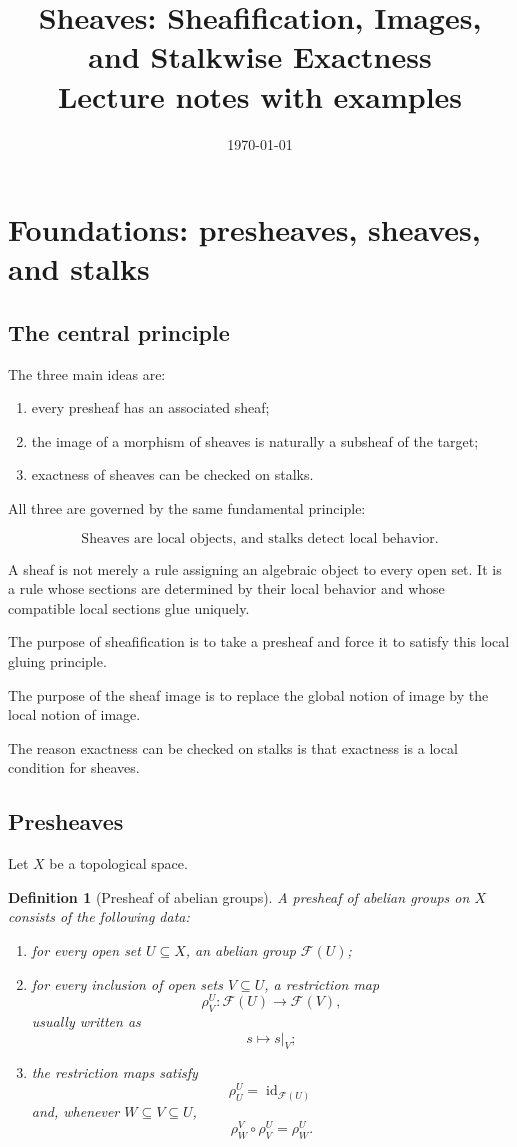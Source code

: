 \documentclass[12pt,a4paper]{article}
\title{\bfseries Sheaves: Sheafification, Images, and Stalkwise Exactness\\


\large Lecture notes with examples}
\author{}
\date{\today}
\DeclareMathOperator{\id}{id}
\theoremstyle{notespace}
\newtheorem{definition}{Definition}[subsection]
\begin{document}
\maketitle
\tableofcontents
\clearpage

\section{Foundations: presheaves, sheaves, and stalks}

\subsection{The central principle}
The three main ideas are:

\begin{enumerate}
	\item every presheaf has an associated sheaf;
	\item the image of a morphism of sheaves is naturally a subsheaf of the target;
	\item exactness of sheaves can be checked on stalks.
\end{enumerate}

All three are governed by the same fundamental principle:

\[
\boxed{
	\text{Sheaves are local objects, and stalks detect local behavior.}
}
\]

A sheaf is not merely a rule assigning an algebraic object to every open set.
It is a rule whose sections are determined by their local behavior and whose
compatible local sections glue uniquely.

The purpose of sheafification is to take a presheaf and force it to satisfy
this local gluing principle.

The purpose of the sheaf image is to replace the global notion of image by the
local notion of image.

The reason exactness can be checked on stalks is that exactness is a local
condition for sheaves.

\subsection{Presheaves}
Let $X$ be a topological space.

\begin{definition}[Presheaf of abelian groups]
	A presheaf of abelian groups on $X$ consists of the following data:
	
	\begin{enumerate}
		\item for every open set $U \subseteq X$, an abelian group $\mathcal F(U)$;
		\item for every inclusion of open sets $V \subseteq U$, a restriction map
		\[
		\rho^U_V : \mathcal F(U) \longrightarrow \mathcal F(V),
		\]
		usually written as
		\[
		s \longmapsto s|_V;
		\]
		\item the restriction maps satisfy
		\[
		\rho^U_U = \id_{\mathcal F(U)}
		\]
		and, whenever $W \subseteq V \subseteq U$,
		\[
		\rho^V_W \circ \rho^U_V = \rho^U_W.
		\]
	\end{enumerate}
\end{definition}
\end{document}
